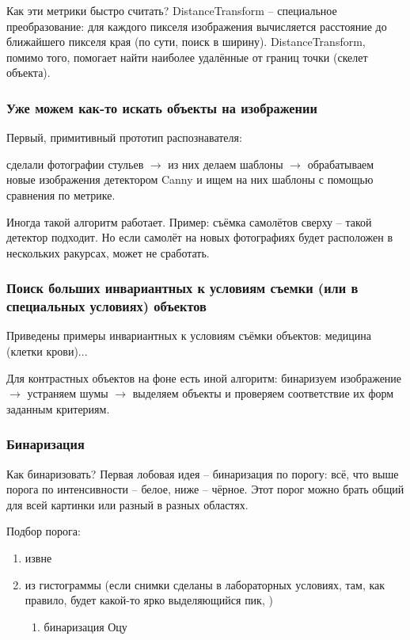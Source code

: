 \documentclass[main.tex]{subfiles}
\begin{document}
Как эти метрики быстро считать?
DistanceTransform -- специальное преобразование: для каждого пикселя изображения вычисляется расстояние до ближайшего пикселя края (по сути, поиск в ширину).
DistanceTransform, помимо того, помогает найти наиболее удалённые от границ точки (скелет объекта).

\subsubsection{Уже можем как-то искать объекты на изображении}

Первый, примитивный прототип распознавателя:

сделали фотографии стульев $ \to $ из них делаем шаблоны $ \to $ обрабатываем новые изображения детектором Canny и ищем на них шаблоны с помощью сравнения по метрике.

Иногда такой алгоритм работает.
Пример: съёмка самолётов сверху -- такой детектор подходит.
Но если самолёт на новых фотографиях будет расположен в нескольких ракурсах, может не сработать.

\subsubsection{Поиск больших инвариантных к условиям съемки (или в специальных условиях) объектов}

Приведены примеры инвариантных к условиям съёмки объектов: медицина (клетки крови)...

Для контрастных объектов на фоне есть иной алгоритм: бинаризуем изображение $ \to $ устраняем шумы $ \to $ выделяем объекты и проверяем соответствие их форм заданным критериям.

\subsubsection{Бинаризация}

Как бинаризовать?
Первая лобовая идея -- бинаризация по порогу: всё, что выше порога по интенсивности -- белое, ниже -- чёрное.
Этот порог можно брать общий для всей картинки или разный в разных областях.

Подбор порога:
\begin{enumerate}[noitemsep]
	\item извне
	\item из гистограммы (если снимки сделаны в лабораторных условиях, там, как правило, будет какой-то ярко выделяющийся пик, )
	\begin{enumerate}[noitemsep]
		\item бинаризация Оцу
	\end{enumerate}
\end{enumerate}
\end{document}
